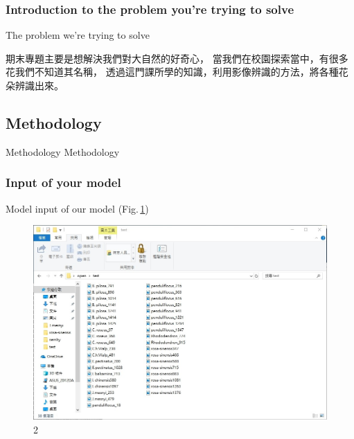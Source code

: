 \documentclass{beamer}
\begin{document}
\subsubsection{Introduction to the problem you're trying to solve \medskip}
\begin{frame}{The problem we're trying to solve}
  \begin{CJK}{UTF8}{bkai}
      \begin{spacing}{1.5}\qquad
	期末專題主要是想解決我們對大自然的好奇心，
	當我們在校園探索當中，有很多花我們不知道其名稱，
	透過這門課所學的知識，利用影像辨識的方法，將各種花朵辨識出來。
	\end{spacing}
  \end{CJK}
\end{frame}

\subsection{Methodology}
\begin{frame}{Methodology}
\center \huge Methodology
\end{frame}

\subsubsection{Input of your model }
\begin{frame}{Model}
  input of our model (Fig.\,\ref{fig:2})
    \begin{figure}
   \includegraphics[width=0.7\linewidth]{input.jpg}
    \caption{2}
    \label{fig:2}
  \end{figure}
\end{frame}
\end{document}
